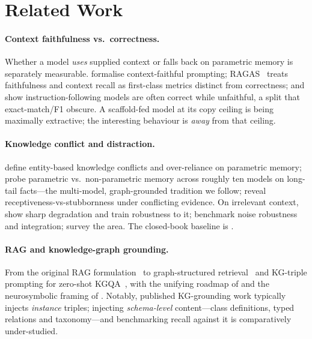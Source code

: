 \documentclass[11pt]{article}
\begin{document}
\section{Related Work}\label{sec:related}
\paragraph{Context faithfulness vs.\ correctness.}
Whether a model \emph{uses} supplied context or falls back on parametric memory is separately
measurable. \textcite{zhou2023contextfaithful} formalise context-faithful prompting;
RAGAS~\cite{es2023ragas} treats faithfulness and context recall as first-class metrics distinct
from correctness; and \textcite{adlakha2024evaluating} show instruction-following models are
often correct while unfaithful, a split that exact-match/F1 obscure. A scaffold-fed model at its
copy ceiling is being maximally extractive; the interesting behaviour is \emph{away} from that
ceiling.

\paragraph{Knowledge conflict and distraction.}
\textcite{longpre2021entity} define entity-based knowledge conflicts and over-reliance on
parametric memory; \textcite{mallen2023trust} probe parametric vs.\ non-parametric memory across
roughly ten models on long-tail facts---the multi-model, graph-grounded tradition we follow;
\textcite{xie2024chameleon} reveal receptiveness-vs-stubbornness under conflicting evidence.
On irrelevant context, \textcite{shi2023distracted} show sharp degradation and
\textcite{yoran2024robust} train robustness to it; \textcite{chen2024rgb} benchmark noise
robustness and integration; \textcite{xu2024knowledgeconflicts} survey the area. The
closed-book baseline is \textcite{roberts2020knowledge}.

\paragraph{RAG and knowledge-graph grounding.}
From the original RAG formulation~\cite{lewis2020rag} to graph-structured
retrieval~\cite{edge2024graphrag,guo2024lightrag} and KG-triple prompting for zero-shot
KGQA~\cite{baek2023kaping}, with the unifying roadmap of \textcite{pan2024unifying} and the
neurosymbolic framing of \textcite{garcez2023neurosymbolic}. Notably, published KG-grounding work
typically injects \emph{instance} triples; injecting \emph{schema-level} content---class
definitions, typed relations and taxonomy---and benchmarking recall against it is comparatively
under-studied.
\end{document}

